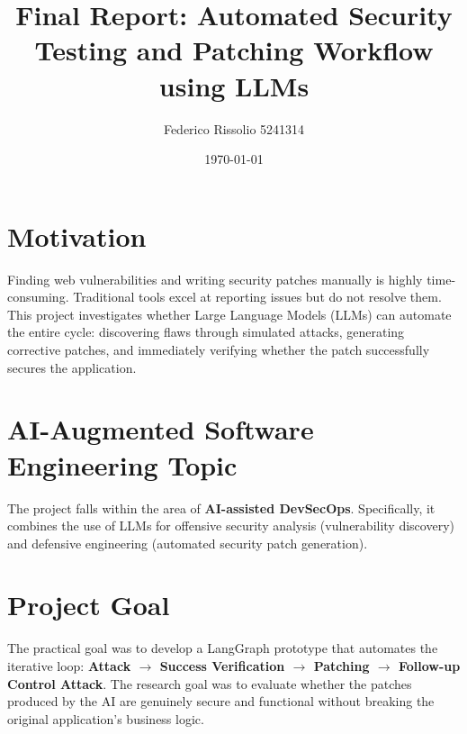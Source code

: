 \documentclass[11pt,a4paper]{article}
\title{\textbf{Final Report: Automated Security Testing and Patching Workflow using LLMs}}
\author{Federico Rissolio 5241314}
\date{\today}
\begin{document}
\maketitle

\section{Motivation}
Finding web vulnerabilities and writing security patches manually is highly time-consuming. Traditional tools excel at reporting issues but do not resolve them. This project investigates whether Large Language Models (LLMs) can automate the entire cycle: discovering flaws through simulated attacks, generating corrective patches, and immediately verifying whether the patch successfully secures the application.

\section{AI-Augmented Software Engineering Topic}
The project falls within the area of \textbf{AI-assisted DevSecOps}. Specifically, it combines the use of LLMs for offensive security analysis (vulnerability discovery) and defensive engineering (automated security patch generation).

\section{Project Goal}
The practical goal was to develop a LangGraph prototype that automates the iterative loop: \textbf{Attack $\rightarrow$ Success Verification $\rightarrow$ Patching $\rightarrow$ Follow-up Control Attack}. 
The research goal was to evaluate whether the patches produced by the AI are genuinely secure and functional without breaking the original application's business logic.
\end{document}
